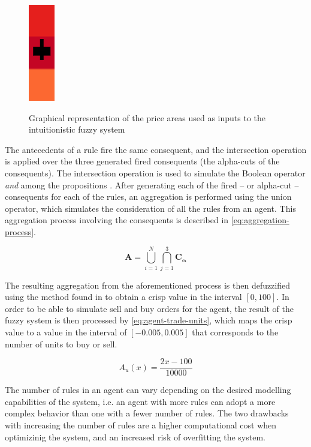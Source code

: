 \begin{figure}
\caption{Graphical representation of the price areas used as inputs to the
  intuitionistic fuzzy system} \centering
\includegraphics[height=0.15\textwidth]{img/areas-for-ifis.png}
\label{figure:areas-for-ifis}
\end{figure}

The antecedents of a rule fire the same consequent, and the intersection
operation is applied over the three generated fired consequents (the alpha-cuts
of the consequents). The intersection operation is used to simulate the Boolean
operator \textit{and} among the propositions \cite{Atanassov1986}. After
generating each of the fired -- or alpha-cut -- consequents for each of the rules,
an aggregation is performed using the union operator, which simulates the
consideration of all the rules from an agent. This aggregation process involving
the consequents is described in \ref{eq:aggregation-process}.

\begin{equation}
  \label{eq:aggregation-process}
  \bm{A} = \bigcup\limits_{i=1}^{N} \bigcap\limits_{j=1}^{3} \bm{C_{\alpha}}
\end{equation}

The resulting aggregation from the aforementioned process is then
defuzzified using the method found in \cite{Hernandez-Aguila2017} to obtain a
crisp value in the interval $[0, 100]$. In order to be able to simulate sell and
buy orders for the agent, the result of the fuzzy system is then processed by
\ref{eq:agent-trade-units}, which maps the crisp value to a value in the
interval of $[-0.005, 0.005]$ that corresponds to the number of units to buy or
sell.

\begin{equation}
  \label{eq:agent-trade-units}
  A_u(x) = \frac{2x - 100}{10000}
\end{equation}

The number of rules in an agent can vary depending on the desired modelling
capabilities of the system, i.e. an agent with more rules can adopt a more
complex behavior than one with a fewer number of rules. The two drawbacks with
increasing the number of rules are a higher computational cost when optimizinig
the system, and an increased risk of overfitting the system. %

